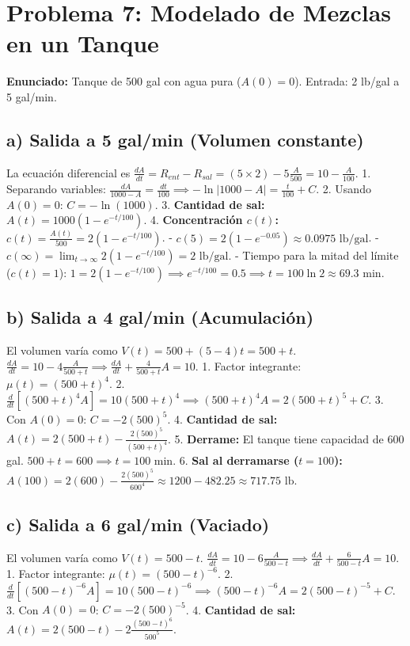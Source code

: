 \documentclass[a4paper]{article}
\begin{document}
\section{Problema 7: Modelado de Mezclas en un Tanque}

\textbf{Enunciado:} Tanque de 500 gal con agua pura ($A(0)=0$). Entrada: 2 lb/gal a 5 gal/min.

\subsection*{a) Salida a 5 gal/min (Volumen constante)}
La ecuación diferencial es $\frac{dA}{dt} = R_{ent} - R_{sal} = (5 \times 2) - 5\frac{A}{500} = 10 - \frac{A}{100}$.
1. Separando variables: $\frac{dA}{1000 - A} = \frac{dt}{100} \implies -\ln|1000 - A| = \frac{t}{100} + C$.
2. Usando $A(0)=0$: $C = -\ln(1000)$.
3. \textbf{Cantidad de sal:} $A(t) = 1000(1 - e^{-t/100})$.
4. \textbf{Concentración $c(t)$:} $c(t) = \frac{A(t)}{500} = 2(1 - e^{-t/100})$.
   - $c(5) = 2(1 - e^{-0.05}) \approx 0.0975 \text{ lb/gal}$.
   - $c(\infty) = \lim_{t \to \infty} 2(1 - e^{-t/100}) = 2 \text{ lb/gal}$.
   - Tiempo para la mitad del límite ($c(t) = 1$): $1 = 2(1 - e^{-t/100}) \implies e^{-t/100} = 0.5 \implies t = 100\ln 2 \approx 69.3 \text{ min}$.

\subsection*{b) Salida a 4 gal/min (Acumulación)}
El volumen varía como $V(t) = 500 + (5-4)t = 500 + t$.
$\frac{dA}{dt} = 10 - 4\frac{A}{500+t} \implies \frac{dA}{dt} + \frac{4}{500+t}A = 10$.
1. Factor integrante: $\mu(t) = (500+t)^4$.
2. $\frac{d}{dt}[(500+t)^4 A] = 10(500+t)^4 \implies (500+t)^4 A = 2(500+t)^5 + C$.
3. Con $A(0)=0$: $C = -2(500)^5$.
4. \textbf{Cantidad de sal:} $A(t) = 2(500+t) - \frac{2(500)^5}{(500+t)^4}$.
5. \textbf{Derrame:} El tanque tiene capacidad de 600 gal. $500 + t = 600 \implies t = 100 \text{ min}$.
6. \textbf{Sal al derramarse ($t=100$):} $A(100) = 2(600) - \frac{2(500)^5}{600^4} \approx 1200 - 482.25 \approx 717.75 \text{ lb}$.

\subsection*{c) Salida a 6 gal/min (Vaciado)}
El volumen varía como $V(t) = 500 - t$.
$\frac{dA}{dt} = 10 - 6\frac{A}{500-t} \implies \frac{dA}{dt} + \frac{6}{500-t}A = 10$.
1. Factor integrante: $\mu(t) = (500-t)^{-6}$.
2. $\frac{d}{dt}[(500-t)^{-6} A] = 10(500-t)^{-6} \implies (500-t)^{-6} A = 2(500-t)^{-5} + C$.
3. Con $A(0)=0$: $C = -2(500)^{-5}$.
4. \textbf{Cantidad de sal:} $A(t) = 2(500-t) - 2\frac{(500-t)^6}{500^5}$.
\end{document}
